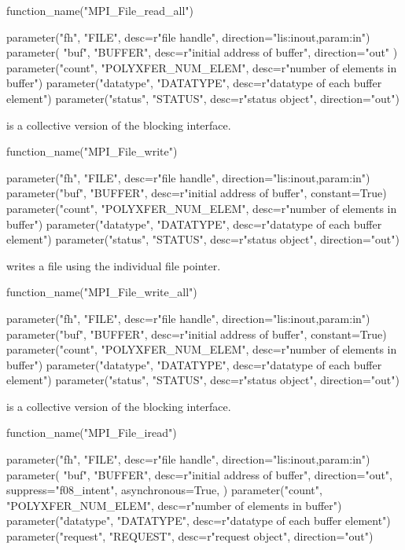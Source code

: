 %
%
\begin{mpi-binding}
    function_name("MPI_File_read_all")
    
    parameter("fh", "FILE", desc=r"file handle", direction="lis:inout,param:in")
    parameter(
        "buf", "BUFFER", desc=r"initial address of buffer", direction="out"
    )
    parameter("count", "POLYXFER_NUM_ELEM", desc=r"number of elements in buffer")
    parameter("datatype", "DATATYPE", desc=r"datatype of each buffer element")
    parameter("status", "STATUS", desc=r"status object", direction="out")
\end{mpi-binding}

 is a collective version
of the blocking  interface.

%
%
\begin{mpi-binding}
    function_name("MPI_File_write")
    
    parameter("fh", "FILE", desc=r"file handle", direction="lis:inout,param:in")
    parameter("buf", "BUFFER", desc=r"initial address of buffer", constant=True)
    parameter("count", "POLYXFER_NUM_ELEM", desc=r"number of elements in buffer")
    parameter("datatype", "DATATYPE", desc=r"datatype of each buffer element")
    parameter("status", "STATUS", desc=r"status object", direction="out")
\end{mpi-binding}

 writes a file using the individual file pointer.

%
%
\begin{mpi-binding}
    function_name("MPI_File_write_all")
    
    parameter("fh", "FILE", desc=r"file handle", direction="lis:inout,param:in")
    parameter("buf", "BUFFER", desc=r"initial address of buffer", constant=True)
    parameter("count", "POLYXFER_NUM_ELEM", desc=r"number of elements in buffer")
    parameter("datatype", "DATATYPE", desc=r"datatype of each buffer element")
    parameter("status", "STATUS", desc=r"status object", direction="out")
\end{mpi-binding}

 is a collective version
of the blocking  interface.

%
%
\begin{mpi-binding}
    function_name("MPI_File_iread")
    
    parameter("fh", "FILE", desc=r"file handle", direction="lis:inout,param:in")
    parameter(
        "buf",
        "BUFFER",
        desc=r"initial address of buffer",
        direction="out",
        suppress="f08_intent",
        asynchronous=True,
    )
    parameter("count", "POLYXFER_NUM_ELEM", desc=r"number of elements in buffer")
    parameter("datatype", "DATATYPE", desc=r"datatype of each buffer element")
    parameter("request", "REQUEST", desc=r"request object", direction="out")
\end{mpi-binding}

